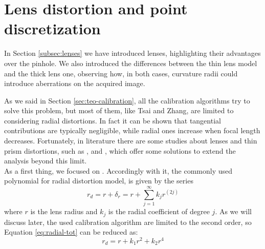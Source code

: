 \section{Lens distortion and point discretization}
\label{sec:model-lens-distortion}
In Section \ref{subsec:lenses} we have introduced lenses, highlighting their advantages over the pinhole. We also introduced the differences between the thin lens model and the thick lens one, observing how, in both cases, curvature radii could introduce aberrations on the acquired image.

As we said in Section \ref{sec:teo-calibration}, all the calibration algorithms try to solve this problem, but most of them, like Tsai and Zhang, are limited to considering radial distortions. In fact it can be shown that tangential contributions are typically negligible, while radial ones increase when focal length decreases. Fortunately, in literature there are some studies about lenses and thin prism distortions, such as \cite{brown},\cite{DBLP:journals/corr/cs-CV-0308003} and \cite{Heikkila}, which offer some solutions to extend the analysis beyond this limit. \\

As a first thing, we focused on \cite{TsaiTvLenses}. Accordingly with it, the commonly used polynomial for radial distortion model, is given by the series
  \begin{equation}
    \label{eq:radial-tot}
    r_d = r + \delta_r = r + \sum_{j=1}^\infty k_jr^{(2j)}
  \end{equation}
where $r$ is the lens radius and $k_j$ is the radial coefficient of degree $j$. As we will discuss later, the used calibration algorithm are limited to the second order, so Equation \ref{eq:radial-tot} can be reduced as:
  \begin{equation}
    \label{eq:radial-2}
    r_d = r + k_1r^2 + k_2r^4
  \end{equation}

